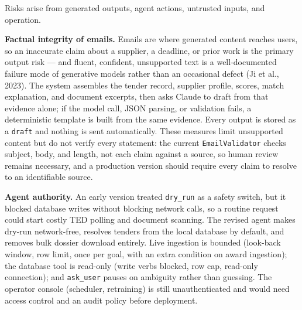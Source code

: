Risks arise from generated outputs, agent actions, untrusted inputs, and operation.

\textbf{Factual integrity of emails.} Emails are where generated content reaches users,
so an inaccurate claim about a supplier, a deadline, or prior work is the primary
output risk --- and fluent, confident, unsupported text is a well-documented failure
mode of generative models rather than an occasional defect (Ji et al., 2023). The
system assembles the tender record, supplier profile, scores, match
explanation, and document excerpts, then asks Claude to draft from that evidence alone;
if the model call, JSON parsing, or validation fails, a deterministic template is built
from the same evidence. Every output is stored as a \texttt{draft} and nothing is sent
automatically. These measures limit unsupported content but do not verify every
statement: the current \texttt{EmailValidator} checks subject, body, and length, not
each claim against a source, so human review remains necessary, and a production
version should require every claim to resolve to an identifiable source.

\textbf{Agent authority.} An early version treated \texttt{dry\_run} as a safety
switch, but it blocked database writes without blocking network calls, so a routine
request could start costly TED polling and document scanning. The revised agent makes
dry-run network-free, resolves tenders from the local database by default, and removes
bulk dossier download entirely. Live ingestion is bounded (look-back window, row limit,
once per goal, with an extra condition on award ingestion); the database tool is
read-only (write verbs blocked, row cap, read-only connection); and \texttt{ask\_user}
pauses on ambiguity rather than guessing. The operator console (scheduler, retraining)
is still unauthenticated and would need access control and an audit policy before
deployment.


